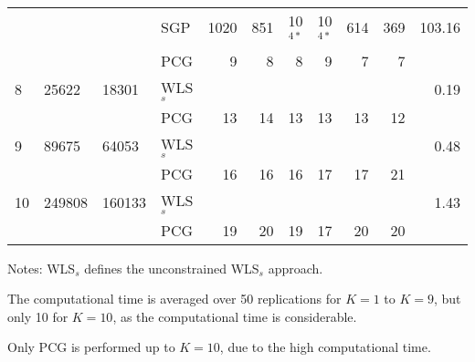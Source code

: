 \documentclass[11pt]{article}
\newcommand{\0}{\phantom{0}}
\begin{document}
\begin{table}[ht]
\begin{threeparttable}
\begin{tabular}{llllrrrrrrr}
			& & & SGP & 1020 & 851 & 10$^{4*}$ & 10$^{4*}$ & 614 & 369 & 103.16 \\
			& & & PCG & 9 & 8 & 8 & 9 & 7 & 7 & \bm{$2.09$} \\
			\midrule
			8 & 25622 & 18301 & WLS$_{s}$ & & & & & & & 0.19 \\
			& & & PCG & 13 & 14 & 13 & 13 & 13 & 12 & \bm{$19.08$} \\
			\midrule
			9 & 89675 & 64053 & WLS$_{s}$ & & & & & & & 0.48 \\
			& & & PCG & 16 & 16 & 16 & 17 & 17 & 21 & \bm{$244.68$} \\
			\midrule
			10 & 249808 & 160133 & WLS$_{s}$ & & & & & & & 1.43 \\
			& & & PCG & 19 & 20 & 19 & 17 & 20 & 20 & \bm{$1660.12$} \\
			\bottomrule
		\end{tabular}
		\begin{tablenotes}
			\item [] Notes: WLS$_{s}$ defines the unconstrained WLS$_{s}$ approach.
			\item [] The computational time is averaged over 50 replications for $K = 1$ to $K = 9$, but only 10 for $K = 10$, as the computational time is considerable.
			\item [] Only PCG is performed up to $K = 10$, due to the high computational time.
		\end{tablenotes}
	\end{threeparttable}
\end{table}
\end{document}
